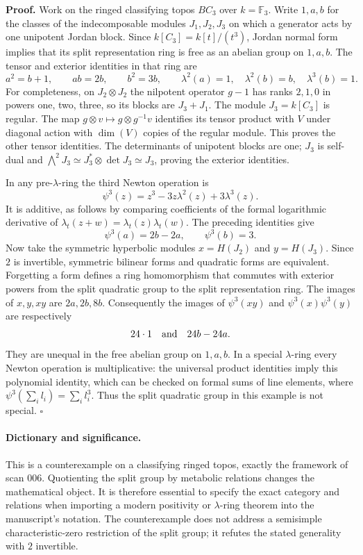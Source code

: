 \textbf{Proof.} Work on the ringed classifying topos $BC_3$ over
$k=\mathbb F_3$.  Write $1,a,b$ for the classes of the indecomposable
modules $J_1,J_2,J_3$ on which a generator acts by one unipotent Jordan
block.  Since $k[C_3]=k[t]/(t^3)$, Jordan normal form implies that its
split representation ring is free as an abelian group on $1,a,b$.
The tensor and exterior identities in that ring are
\[
 a^2=b+1,\qquad ab=2b,\qquad b^2=3b,
 \qquad \lambda^2(a)=1,\quad\lambda^2(b)=b,\quad\lambda^3(b)=1.
\]
For completeness, on $J_2\otimes J_2$ the nilpotent operator $g-1$ has
ranks $2,1,0$ in powers one, two, three, so its blocks are $J_3+J_1$.
The module $J_3=k[C_3]$ is regular.  The map
$g\otimes v\mapsto g\otimes g^{-1}v$ identifies its tensor product with
$V$ under diagonal action with $\dim(V)$ copies of the regular module.
This proves the other tensor identities.  The determinants of unipotent
blocks are one; $J_3$ is self-dual and
$\bigwedge^2J_3\simeq J_3^*\otimes\det J_3\simeq J_3$, proving the
exterior identities.

In any pre-$\lambda$-ring the third Newton operation is
\[
 \psi^3(z)=z^3-3z\lambda^2(z)+3\lambda^3(z).
\]
It is additive, as follows by comparing coefficients of the formal
logarithmic derivative of $\lambda_t(z+w)=\lambda_t(z)\lambda_t(w)$.
The preceding identities give
\[
 \psi^3(a)=2b-2a,\qquad \psi^3(b)=3.
\]
Now take the symmetric hyperbolic modules $x=H(J_2)$ and $y=H(J_3)$.
Since $2$ is invertible, symmetric bilinear forms and quadratic forms
are equivalent.  Forgetting a form defines a ring homomorphism that
commutes with exterior powers from the split quadratic group to the
split representation ring.  The images of $x,y,xy$ are $2a,2b,8b$.
Consequently the images of $\psi^3(xy)$ and $\psi^3(x)\psi^3(y)$ are
respectively
\[
 24\cdot1\quad\hbox{and}\quad24b-24a.
\]
They are unequal in the free abelian group on $1,a,b$.  In a special
$\lambda$-ring every Newton operation is multiplicative: the universal
product identities imply this polynomial identity, which can be checked
on formal sums of line elements, where $\psi^3(\sum_i l_i)=\sum_i l_i^3$.
Thus the split quadratic group in this example is not special.
\hfill$\square$
\paragraph{Dictionary and significance.}
This is a counterexample on a classifying ringed topos, exactly the
framework of scan 006.  Quotienting the split group by metabolic relations
changes the mathematical object.  It is therefore essential to specify
the exact category and relations when importing a modern positivity or
$\lambda$-ring theorem into the manuscript's notation.  The counterexample
does not address a semisimple characteristic-zero restriction of the
split group; it refutes the stated generality with $2$ invertible.

